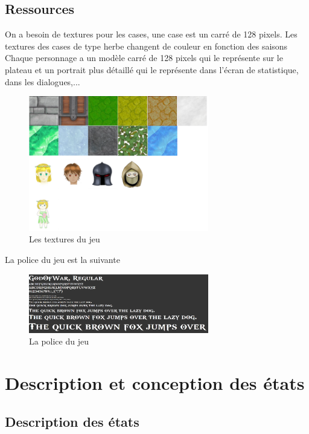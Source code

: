 \documentclass[a4paper,12pt]{article}
\begin{document}
\subsection{Ressources}
On a besoin de textures pour les cases, une case est un carré de 128 pixels. Les textures des cases de type herbe changent de couleur en fonction des saisons
Chaque personnage a un modèle carré de 128 pixels qui le représente sur le plateau et un portrait plus détaillé qui le représente dans l'écran de statistique, dans les dialogues,...
\begin{figure}[ht]
\begin{center}
\includegraphics[width=0.7\textwidth]{textures.png}
\caption{\label{pacmangame}Les textures du jeu}
\end{center}
\end{figure}
\newpage
La police du jeu est la suivante 
\begin{figure}[ht]
\begin{center}
\includegraphics[width=0.7\textwidth]{ressource_police.png}
\caption{\label{pacmangame}La police du jeu}
\end{center}
\end{figure}
\clearpage
\section{Description et conception des états}

\subsection{Description des états}
\end{document}
